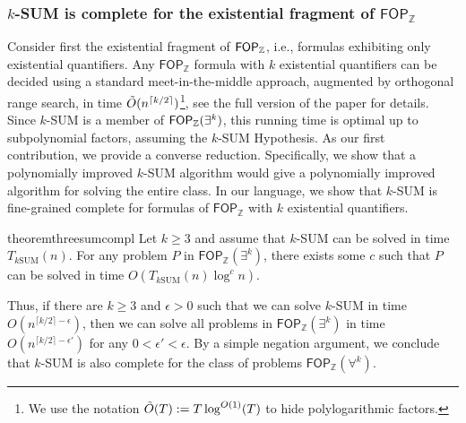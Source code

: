 \subsubsection{$k$-SUM is complete for the existential fragment of $\mathsf{FOP}_{\mathbb{Z}}$}
Consider first the existential fragment of $\mathsf{FOP}_{\mathbb{Z}}$, i.e., formulas exhibiting only existential quantifiers.
Any $\mathsf{FOP}_{\mathbb{Z}}$ formula with $k$ existential quantifiers can be decided using a standard meet-in-the-middle approach, augmented by orthogonal range search, in time $\Tilde{O}(n^ {\lceil k/2 \rceil})$\footnote{We use the notation $\Tilde{O}(T):=T \log^{O(1)}(T)$ to hide polylogarithmic factors.}, see the full version of the paper for details. Since $k$-SUM is a member of $\mathsf{FOP}_{\mathbb{Z}}(\exists^k)$, this running time is optimal up to subpolynomial factors, assuming the $k$-SUM Hypothesis.
As our first contribution, we provide a converse reduction. Specifically, we show that a polynomially improved $k$-SUM algorithm would give a polynomially improved algorithm for solving the entire class. In our language, we show that $k$-SUM is fine-grained complete for formulas of $\mathsf{FOP}_{\mathbb{Z}}$ with $k$ existential quantifiers.

\begin{restatable}{theorem}{threesumcompl}
	Let $k\geq 3$ and assume that $k$-SUM can be solved in time $T_{k\mathrm{SUM}}(n)$. For any problem $P$ in $\mathsf{FOP}_{\mathbb{Z}}(\exists^k )$, there exists some $c$ such that $P$ can be solved in time $O(T_{k\mathrm{SUM}}(n) \log^c n)$. 
\label{existential_complete}
\end{restatable}

Thus, if there are $k\geq 3$ and $\epsilon>0$ such that we can solve $k$-SUM in time $O(n^{\lceil k/2 \rceil-\epsilon})$, then we can solve all problems in $\mathsf{FOP}_{\mathbb{Z}}(\exists^k )$ in time  $O(n^{\lceil k/2 \rceil-\epsilon'})$ for any $0 < \epsilon' < \epsilon$.
By a simple negation argument, we conclude that $k$-SUM is also complete for the class of problems $\mathsf{FOP}_{\mathbb{Z}}(\forall^k)$.

